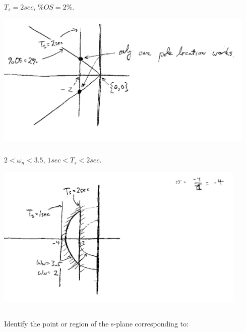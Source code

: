 \documentclass{article}	%
\begin{document}
\subsubsection{} $T_s = 2sec$, $\%OS = 2\%$.

\includegraphics[width=12.5cm]{00548a.png}	%



\subsubsection{} $2<\omega_n<3.5$, $1sec < T_s < 2sec$.

\includegraphics[width=12cm]{00549a.png}	%






\subsection{}  Identify the point or region of the s-plane corresponding to:
\end{document}
